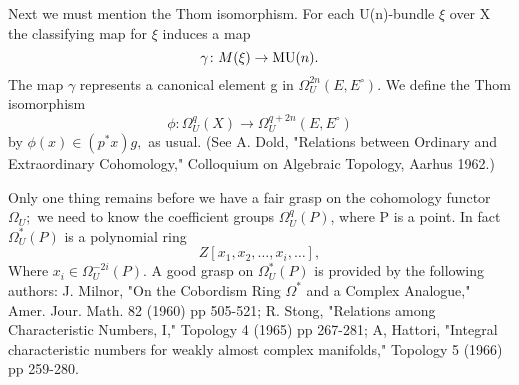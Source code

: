 \documentclass[../main]{subfiles}
\begin{document}
Next we must mention the Thom isomorphism. For each U(n)-bundle $\xi$ over X the classifying map for $\xi$ induces a map
$$
  \gamma\colon  M(\xi) \to  \mathop{\mathrm{MU}}(n). 
$$ 
The map $\gamma$ represents a canonical element g in $\Omega^{2n}_{U}(E,E^{\circ})$. We define the Thom isomorphism
$$
\phi\colon  \Omega^{q}_{U}(X) \to  \Omega^{q+2n}_{U}(E,E^{\circ})
$$ 
by $\phi(x) \in {(p^{\ast} x)g,}$ as usual. (See A. Dold, "Relations between Ordinary and Extraordinary Cohomology," Colloquium on Algebraic Topology, Aarhus 1962.)

Only one thing remains before we have a fair grasp on the cohomology functor $\Omega^{}_{U};$ we need to know the coefficient groups $\Omega^{q}_{U}(P)$, where P is a point. In fact $\Omega^{\ast}_{U}(P)$ is a polynomial ring
$$
Z[x_1,x_2,\ldots,x_{i},\ldots],
$$ 
Where $x_{i} \in \Omega^{-2i}_{U}(P).$ A good grasp on $\Omega^{\ast}_{U}(P)$ is provided by the following authors: J. Milnor, "On the Cobordism Ring $\Omega^{\ast}$ and a Complex Analogue," Amer. Jour. Math. 82 (1960) pp 505-521; R. Stong, "Relations among Characteristic Numbers, I," Topology 4 (1965) pp 267-281; A, Hattori, "Integral characteristic numbers for weakly almost complex manifolds," Topology 5 (1966) pp 259-280.
\end{document}
